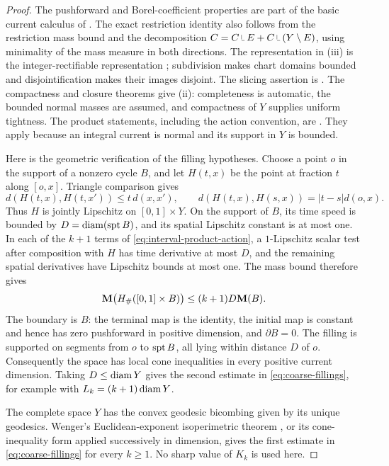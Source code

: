 \begin{proof}
The pushforward and Borel-coefficient properties are part of the basic
current calculus of \cite{AK2000}. The exact restriction identity also
follows from the restriction mass bound and the decomposition
\(C=C\restr E+C\restr(Y\setminus E)\), using minimality of the mass
measure in both directions. The representation in (iii) is the
integer-rectifiable representation
\cite[Lemma~4.1 and Theorem~4.5]{AK2000}; subdivision makes chart domains
bounded and disjointification makes their images disjoint. The slicing
assertion is \cite[Theorems~5.6--5.7]{AK2000}. The compactness and closure
theorems \cite[Theorems~5.2 and~8.5]{AK2000} give (ii): completeness is
automatic, the bounded normal masses are assumed, and compactness of
\(Y\) supplies uniform tightness. The product statements, including the
action convention, are
\cite[Definition~3.1 and Theorem~3.2]{Wenger2007Flat}. They apply because
an integral current is normal and its support in \(Y\) is bounded.

Here is the geometric verification of the filling hypotheses. Choose a
point \(o\) in the support of a nonzero cycle \(B\), and let
\(H(t,x)\) be the point at fraction \(t\) along \([o,x]\).
Triangle comparison gives
\[
 d(H(t,x),H(t,x'))\le t\,d(x,x'),\qquad
 d(H(t,x),H(s,x))=|t-s|d(o,x).
\]
Thus \(H\) is jointly Lipschitz on \([0,1]\times Y\).
On the support of \(B\), its time speed is bounded by
\(D=\operatorname{diam}(\operatorname{spt} B)\), and its spatial Lipschitz constant is at most one.
In each of the \(k+1\) terms of \eqref{eq:interval-product-action}, a
\(1\)-Lipschitz scalar test after composition with \(H\) has time
derivative at most \(D\), and the remaining spatial derivatives have
Lipschitz bounds at most one. The mass bound therefore gives
\begin{equation}
\label{eq:cone-mass-bound}
 \mathbf M\bigl(H_\#([0,1]\times B)\bigr)
 \le (k+1)D\mathbf M(B).
\end{equation}
The boundary is \(B\): the terminal map is the identity, the initial
map is constant and hence has zero pushforward in positive dimension,
and \(\partial B=0\). The filling is supported on segments from \(o\)
to \(\operatorname{spt} B\), all lying within distance \(D\) of \(o\).
Consequently the space has local cone inequalities in every positive
current dimension. Taking \(D\le\operatorname{diam} Y\) gives the second estimate
in \eqref{eq:coarse-fillings}, for example with
\(L_k=(k+1)\operatorname{diam} Y\).

The complete space \(Y\) has the convex geodesic bicombing given by its
unique geodesics. Wenger's Euclidean-exponent isoperimetric theorem
\cite[Theorem~1.2 and Corollary~1.4]{Wenger2005Iso}, or its cone-inequality
form applied successively in dimension, gives the first estimate in
\eqref{eq:coarse-fillings} for every \(k\ge1\). No sharp value of
\(K_k\) is used here.


\end{proof}
